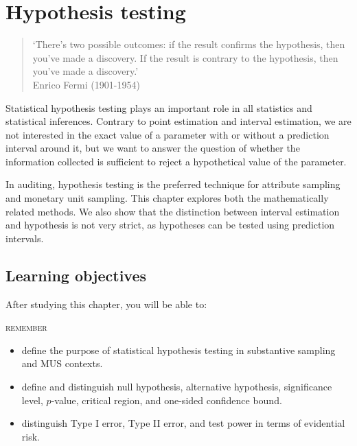 \chapter{Hypothesis testing} %
\label{cha:hypothesis_testing}

\begin{quote}
`There's two possible outcomes:  \newline if the result confirms the hypothesis, then you've made a discovery. \newline If the result is contrary to the hypothesis, then you've made a discovery.'\\
Enrico Fermi (1901-1954)
\end{quote}


Statistical hypothesis testing plays an important role in all statistics and statistical inferences. Contrary to point estimation and interval estimation, we are not interested in the exact value of a parameter with or without a prediction interval around it, but we want to answer the question of whether the information collected is sufficient to reject a hypothetical value of the parameter.

In auditing, hypothesis testing is the preferred technique for attribute sampling and monetary unit sampling. This chapter explores both the mathematically related methods. We also show that the distinction between interval estimation and hypothesis is not very strict, as hypotheses can be tested using prediction intervals.

\section*{Learning objectives}
After studying this chapter, you will be able to:

\bigskip
\noindent \textsc{remember}

\begin{itemize}

\item define the purpose of statistical hypothesis testing in substantive sampling and MUS contexts.
\item define and distinguish null hypothesis, alternative hypothesis, significance level, $p$-value, critical region, and one-sided confidence bound.
\item distinguish Type I error, Type II error, and test power in terms of evidential risk.
\end{itemize}

